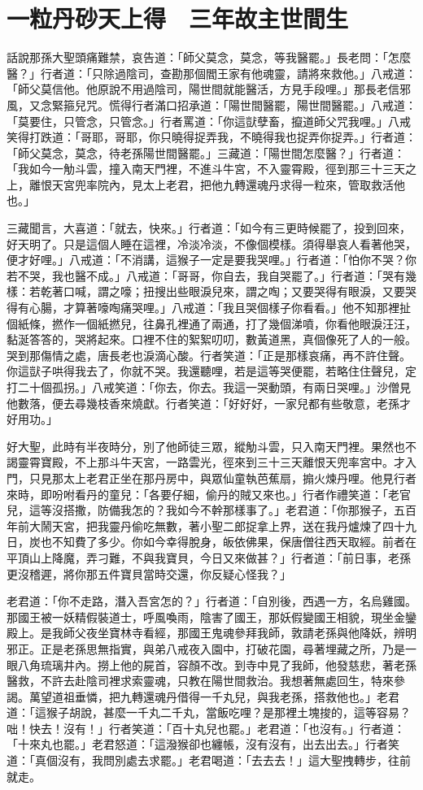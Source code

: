 
\chapter{一粒丹砂天上得　三年故主世間生}

話說那孫大聖頭痛難禁，哀告道：「師父莫念，莫念，等我醫罷。」長老問：「怎麼醫？」行者道：「只除過陰司，查勘那個閻王家有他魂靈，請將來救他。」八戒道：「師父莫信他。他原說不用過陰司，陽世間就能醫活，方見手段哩。」那長老信邪風，又念緊箍兒咒。慌得行者滿口招承道：「陽世間醫罷，陽世間醫罷。」八戒道：「莫要住，只管念，只管念。」行者罵道：「你這獃孽畜，攛道師父咒我哩。」八戒笑得打跌道：「哥耶，哥耶，你只曉得捉弄我，不曉得我也捉弄你捉弄。」行者道：「師父莫念，莫念，待老孫陽世間醫罷。」三藏道：「陽世間怎麼醫？」行者道：「我如今一觔斗雲，撞入南天門裡，不進斗牛宮，不入靈霄殿，徑到那三十三天之上，離恨天宮兜率院內，見太上老君，把他九轉還魂丹求得一粒來，管取救活他也。」

三藏聞言，大喜道：「就去，快來。」行者道：「如今有三更時候罷了，投到回來，好天明了。只是這個人睡在這裡，冷淡冷淡，不像個模樣。須得舉哀人看著他哭，便才好哩。」八戒道：「不消講，這猴子一定是要我哭哩。」行者道：「怕你不哭？你若不哭，我也醫不成。」八戒道：「哥哥，你自去，我自哭罷了。」行者道：「哭有幾樣：若乾著口喊，謂之嚎；扭搜出些眼淚兒來，謂之啕；又要哭得有眼淚，又要哭得有心腸，才算著嚎啕痛哭哩。」八戒道：「我且哭個樣子你看看。」他不知那裡扯個紙條，撚作一個紙撚兒，往鼻孔裡通了兩通，打了幾個涕噴，你看他眼淚汪汪，黏涎答答的，哭將起來。口裡不住的絮絮叨叨，數黃道黑，真個像死了人的一般。哭到那傷情之處，唐長老也淚滴心酸。行者笑道：「正是那樣哀痛，再不許住聲。你這獃子哄得我去了，你就不哭。我還聽哩，若是這等哭便罷，若略住住聲兒，定打二十個孤拐。」八戒笑道：「你去，你去。我這一哭動頭，有兩日哭哩。」沙僧見他數落，便去尋幾枝香來燒獻。行者笑道：「好好好，一家兒都有些敬意，老孫才好用功。」

好大聖，此時有半夜時分，別了他師徒三眾，縱觔斗雲，只入南天門裡。果然也不謁靈霄寶殿，不上那斗牛天宮，一路雲光，徑來到三十三天離恨天兜率宮中。才入門，只見那太上老君正坐在那丹房中，與眾仙童執芭蕉扇，搧火煉丹哩。他見行者來時，即吩咐看丹的童兒：「各要仔細，偷丹的賊又來也。」行者作禮笑道：「老官兒，這等沒搭撒，防備我怎的？我如今不幹那樣事了。」老君道：「你那猴子，五百年前大鬧天宮，把我靈丹偷吃無數，著小聖二郎捉拿上界，送在我丹爐煉了四十九日，炭也不知費了多少。你如今幸得脫身，皈依佛果，保唐僧往西天取經。前者在平頂山上降魔，弄刁難，不與我寶貝，今日又來做甚？」行者道：「前日事，老孫更沒稽遲，將你那五件寶貝當時交還，你反疑心怪我？」

老君道：「你不走路，潛入吾宮怎的？」行者道：「自別後，西遇一方，名烏雞國。那國王被一妖精假裝道士，呼風喚雨，陰害了國王，那妖假變國王相貌，現坐金鑾殿上。是我師父夜坐寶林寺看經，那國王鬼魂參拜我師，敦請老孫與他降妖，辨明邪正。正是老孫思無指實，與弟八戒夜入園中，打破花園，尋著埋藏之所，乃是一眼八角琉璃井內。撈上他的屍首，容顏不改。到寺中見了我師，他發慈悲，著老孫醫救，不許去赴陰司裡求索靈魂，只教在陽世間救治。我想著無處回生，特來參謁。萬望道祖垂憐，把九轉還魂丹借得一千丸兒，與我老孫，搭救他也。」老君道：「這猴子胡說，甚麼一千丸二千丸，當飯吃哩？是那裡土塊捘的，這等容易？咄！快去！沒有！」行者笑道：「百十丸兒也罷。」老君道：「也沒有。」行者道：「十來丸也罷。」老君怒道：「這潑猴卻也纏帳，沒有沒有，出去出去。」行者笑道：「真個沒有，我問別處去求罷。」老君喝道：「去去去！」這大聖拽轉步，往前就走。


